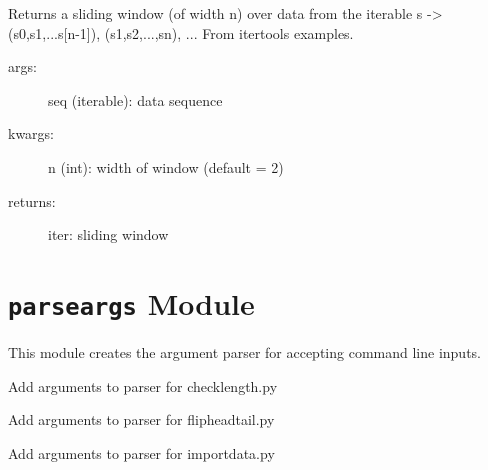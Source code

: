 \documentclass[letterpaper,10pt,openany,oneside]{sphinxmanual}
\begin{document}

\begin{fulllineitems}
\label{index:calc.window}
Returns a sliding window (of width n) over data from the iterable
s -\textgreater{} (s0,s1,...s{[}n-1{]}), (s1,s2,...,sn), ...
From itertools examples.
\begin{description}
\item[{args:}] \leavevmode
seq (iterable): data sequence

\item[{kwargs:}] \leavevmode
n (int): width of window (default = 2)

\item[{returns:}] \leavevmode
iter: sliding window

\end{description}

\end{fulllineitems}



\chapter{\texttt{parseargs} Module}
\label{index:module-parseargs}\label{index:parseargs-module}
This module creates the argument parser for accepting command line inputs.

\begin{fulllineitems}
\label{index:parseargs.addchecklength}
Add arguments to parser for checklength.py

\end{fulllineitems}


\begin{fulllineitems}
\label{index:parseargs.addflipheadtail}
Add arguments to parser for flipheadtail.py

\end{fulllineitems}


\begin{fulllineitems}
\label{index:parseargs.addimportdata}
Add arguments to parser for importdata.py

\end{fulllineitems}
\end{document}
